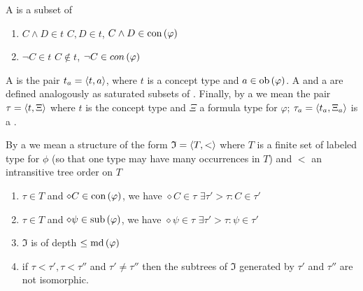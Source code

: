 \begin{defi}
A  is a subset of  \stTx{}
\begin{enumerate}
 \item $C\wedge D\in t$ \iffTx{} $C,D\in t$, \feTx{} $C\wedge D\in\mbox{con}\left(\varphi\right)$
 \item $\neg C\in t$ \iffTx{} $C\notin t$, \feTx{} $\neg C\in con\left(\varphi\right)$
\end{enumerate}
A  is the pair $t_a=\left\langle t,a\right\rangle$, where $t$ is a concept type and $a\in\mbox{ob}\left(\varphi\right)$. A  and a  are defined analogously as saturated subsets of . Finally, by a  we mean the pair $\tau=\left\langle t,\Xi\right\rangle$ where $t$ is the concept type and $\Xi$ a formula type for $\varphi$; $\tau_a=\left\langle t_a,\Xi_a\right\rangle$ is a .
\cite{conf/ijcai/WolterZ99}
\end{defi}

\begin{defi}
By a  we mean a structure of the form $\mathfrak{I}=\left\langle T,<\right\rangle$ where $T$ is a finite set of labeled type for $\phi$ (so that one type may have many occurrences in $T$) and $<$ an intransitive tree order on $T$ \stTx{}
\begin{enumerate}
 \item \faTx{} $\tau\in T$ and $\diamond C\in\mbox{con}\left(\varphi\right)$, we have $\diamond C\in\tau$ \iffTx{} $\exists \tau'>\tau:C\in\tau'$
 \item \faTx{} $\tau\in T$ and $\diamond \psi\in\mbox{sub}\left(\varphi\right)$, we have $\diamond\psi\in\tau$ \iffTx{} $\exists \tau'>\tau:\psi\in\tau'$
 \item $\mathfrak{I}$ is of depth $\leq\mbox{md}\left(\varphi\right)$
 \item if $\tau<\tau',\tau<\tau''$ and $\tau'\neq\tau''$ then the subtrees of $\mathfrak{I}$ generated by $\tau'$ and $\tau''$ are not isomorphic.
\end{enumerate}
\cite{conf/ijcai/WolterZ99}
\end{defi}

